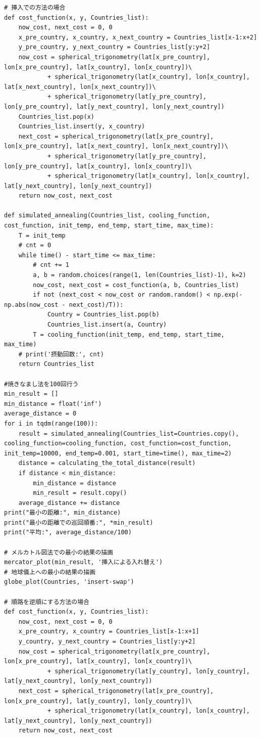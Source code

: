 \documentclass[a4paper,11pt]{ltjsarticle}
\begin{document}
\begin{lstlisting}
# 挿入での方法の場合
def cost_function(x, y, Countries_list):
    now_cost, next_cost = 0, 0
    x_pre_country, x_country, x_next_country = Countries_list[x-1:x+2]
    y_pre_country, y_next_country = Countries_list[y:y+2]
    now_cost = spherical_trigonometry(lat[x_pre_country], lon[x_pre_country], lat[x_country], lon[x_country])\
            + spherical_trigonometry(lat[x_country], lon[x_country], lat[x_next_country], lon[x_next_country])\
            + spherical_trigonometry(lat[y_pre_country], lon[y_pre_country], lat[y_next_country], lon[y_next_country])
    Countries_list.pop(x)
    Countries_list.insert(y, x_country)
    next_cost = spherical_trigonometry(lat[x_pre_country], lon[x_pre_country], lat[x_next_country], lon[x_next_country])\
            + spherical_trigonometry(lat[y_pre_country], lon[y_pre_country], lat[x_country], lon[x_country])\
            + spherical_trigonometry(lat[x_country], lon[x_country], lat[y_next_country], lon[y_next_country])
    return now_cost, next_cost

def simulated_annealing(Countries_list, cooling_function, cost_function, init_temp, end_temp, start_time, max_time):
    T = init_temp
    # cnt = 0
    while time() - start_time <= max_time:
        # cnt += 1
        a, b = random.choices(range(1, len(Countries_list)-1), k=2)
        now_cost, next_cost = cost_function(a, b, Countries_list)
        if not (next_cost < now_cost or random.random() < np.exp(-np.abs(now_cost - next_cost)/T)):
            Country = Countries_list.pop(b)
            Countries_list.insert(a, Country)
        T = cooling_function(init_temp, end_temp, start_time, max_time)
    # print('摂動回数:', cnt)
    return Countries_list

#焼きなまし法を100回行う
min_result = []
min_distance = float('inf')
average_distance = 0
for i in tqdm(range(100)):
    result = simulated_annealing(Countries_list=Countries.copy(), cooling_function=cooling_function, cost_function=cost_function, init_temp=10000, end_temp=0.001, start_time=time(), max_time=2)
    distance = calculating_the_total_distance(result)
    if distance < min_distance:
        min_distance = distance
        min_result = result.copy()
    average_distance += distance
print("最小の距離:", min_distance)
print("最小の距離での巡回順番:", *min_result)
print("平均:", average_distance/100)

# メルカトル図法での最小の結果の描画
mercator_plot(min_result, '挿入による入れ替え')
# 地球儀上への最小の結果の描画
globe_plot(Countries, 'insert-swap')

# 順路を逆順にする方法の場合
def cost_function(x, y, Countries_list):
    now_cost, next_cost = 0, 0
    x_pre_country, x_country = Countries_list[x-1:x+1]
    y_country, y_next_country = Countries_list[y:y+2]
    now_cost = spherical_trigonometry(lat[x_pre_country], lon[x_pre_country], lat[x_country], lon[x_country])\
            + spherical_trigonometry(lat[y_country], lon[y_country], lat[y_next_country], lon[y_next_country])
    next_cost = spherical_trigonometry(lat[x_pre_country], lon[x_pre_country], lat[y_country], lon[y_country])\
            + spherical_trigonometry(lat[x_country], lon[x_country], lat[y_next_country], lon[y_next_country])
    return now_cost, next_cost


\end{lstlisting}
\end{document}
